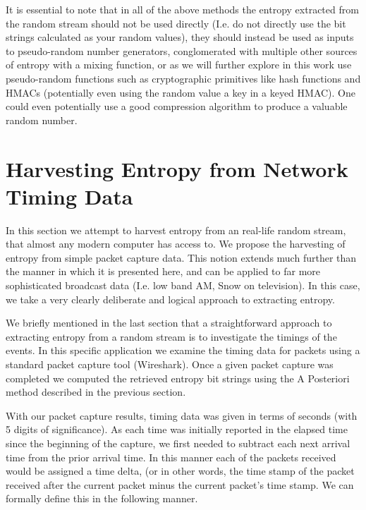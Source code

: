 \documentclass{IEEEtran}
\begin{document}
It is essential to note that in all of the above methods the entropy extracted from the random stream should not be used directly (I.e. do not directly use the bit strings calculated as your random values), they should instead be used as inputs to pseudo-random number generators, conglomerated with multiple other sources of entropy with a mixing function, or as we will further explore in this work use pseudo-random functions such as cryptographic primitives like hash functions and HMACs (potentially even using the random value a key in a keyed HMAC). One could even potentially use a good compression algorithm to produce a valuable random number. 

\section{Harvesting Entropy from Network Timing Data} 
In this section we attempt to harvest entropy from an real-life random stream, that almost any modern computer has access to. We propose the harvesting of entropy from simple packet capture data. This notion extends much further than the manner in which it is presented here, and can be applied to far more sophisticated broadcast data (I.e. low band AM, Snow on television). In this case, we take a very clearly deliberate and logical approach to extracting entropy. 

We briefly mentioned in the last section that a straightforward approach to extracting entropy from a random stream is to investigate the timings of the events. In this specific application we examine the timing data for packets using a standard packet capture tool (Wireshark). Once a given packet capture was completed we computed the retrieved entropy bit strings using the A Posteriori method described in the previous section. 

With our packet capture results, timing data was given in terms of seconds (with 5 digits of significance). As each time was initially reported in the elapsed time since the beginning of the capture, we first needed to subtract each next arrival time from the prior arrival time. In this manner each of the packets received would be assigned a time delta, (or in other words, the time stamp of the packet received after the current packet minus the current packet's time stamp. We can formally define this in the following manner. 
\end{document}
